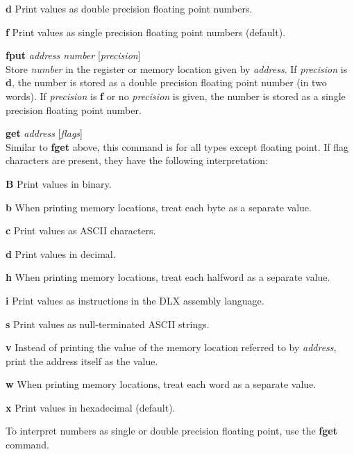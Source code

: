 \begin{mylist}
\begin{mylist}
\begin{mylist}
\item[{\bf d}\hfill] Print values as double precision floating point numbers.
\item[{\bf f}\hfill] Print values as single precision floating point numbers (default).
\end{mylist}

\item[{\bf fput} {\em address number} {[}{\em precision}{]}]
\nopagebreak \hfill \\
Store {\em number} in the register or memory location given by {\em
address}.  If {\em precision} is {\bf d}, the number is stored as a
double precision floating point number (in two words).  If {\em
precision} is {\bf f} or no {\em precision} is given, the number is
stored as a single precision floating point number.

\item[{\bf get} {\em address} {[}{\em flags}{]}]
\nopagebreak \hfill \\
Similar to {\bf fget} above, this command is for all types except
floating point.  If flag characters are present, they have the following
interpretation:

\begin{mylist}
\item[{\bf B}\hfill] Print values in binary.
\item[{\bf b}\hfill] When printing memory locations, treat each byte as
a separate value.
\item[{\bf c}\hfill] Print values as ASCII characters.
\item[{\bf d}\hfill] Print values in decimal.
\item[{\bf h}\hfill] When printing memory locations, treat each halfword
as a separate value.
\item[{\bf i}\hfill] Print values as instructions in the DLX assembly
language.
\item[{\bf s}\hfill] Print values as null-terminated ASCII strings.
\item[{\bf v}\hfill] Instead of printing the value of the memory location
referred to by {\em address}, print the address itself as the value.
\item[{\bf w}\hfill] When printing memory locations, treat each word as a
separate value.
\item[{\bf x}\hfill] Print values in hexadecimal (default).
\end{mylist}

To interpret numbers as single or double precision floating point, use
the {\bf fget} command.


\end{mylist}
\end{mylist}
